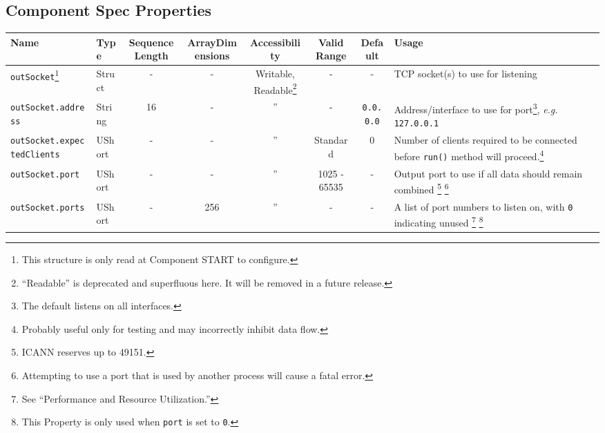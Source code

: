 \documentclass{article}
\begin{document}
\begin{landscape}
  \section*{Component Spec Properties}
  \begin{minipage}{\textwidth}
    \renewcommand*\footnoterule{} %
    \renewcommand{\thempfootnote}{\arabic{mpfootnote}} %
  \begin{scriptsize}
    \begin{tabular}{|p{3.2cm}|p{1.5cm}|c|c|c|c|c|p{7cm}|}
      \hline
      \rowcolor{blue}
      Name &
      Type &
      SequenceLength &
      ArrayDimensions &
      Accessibility &
      Valid Range &
      Default &
      Usage \\
      \hline
      \verb+outSocket+\footnote{This structure is only read at Component START to configure.} &
      Struct &
      - &
      - &
      Writable, Readable\footnote{``Readable'' is deprecated and superfluous here. It will be removed in a future release.}\setcounter{fnreadable}{\thempfootnote} &
      - &
      - &
      TCP socket(s) to use for listening \\
      \hline
      \verb+outSocket.address+ &
      String &
      16 &
      - &
      '' &
      - &
      \verb+0.0.0.0+ &
      Address/interface to use for port\footnote{The default listens on all interfaces.}, \textit{e.g.} \verb+127.0.0.1+ \\
      \hline
      \verb+outSocket.expectedClients+ &
      UShort &
      - &
      - &
      '' &
      Standard &
      0 &
      Number of clients required to be connected before \verb+run()+ method will proceed.\footnote{Probably useful only for testing and may incorrectly inhibit data flow.} \\
      \hline
      \verb+outSocket.port+ &
      UShort &
      - &
      - &
      '' &
      1025 - 65535 &
      - &
      Output port to use if all data should remain combined \footnote{ICANN reserves up to 49151.} \footnote{Attempting to use a port that is used by another process will cause a fatal error.} \\
      \hline
      \verb+outSocket.ports+ &
      UShort &
      - &
      256 &
      '' &
      - &
      - &
      A list of port numbers to listen on, with \verb+0+ indicating unused \footnote{See ``Performance and Resource Utilization.''} \footnote{This Property is only used when \texttt{port} is set to \texttt{0}.}\\

\end{tabular}
\end{scriptsize}
\end{minipage}
\end{landscape}
\end{document}

